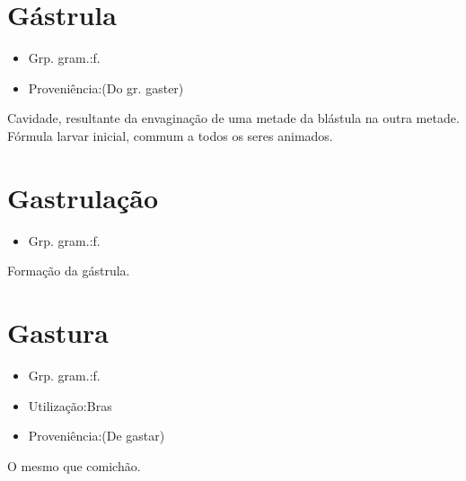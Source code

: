 \section{Gástrula}
\begin{itemize}
\item {Grp. gram.:f.}
\end{itemize}
\begin{itemize}
\item {Proveniência:(Do gr. \textunderscore gaster\textunderscore )}
\end{itemize}
Cavidade, resultante da envaginação de uma metade da blástula na outra metade.
Fórmula larvar inicial, commum a todos os seres animados.
\section{Gastrulação}
\begin{itemize}
\item {Grp. gram.:f.}
\end{itemize}
Formação da gástrula.
\section{Gastura}
\begin{itemize}
\item {Grp. gram.:f.}
\end{itemize}
\begin{itemize}
\item {Utilização:Bras}
\end{itemize}
\begin{itemize}
\item {Proveniência:(De \textunderscore gastar\textunderscore )}
\end{itemize}
O mesmo que \textunderscore comichão\textunderscore .
